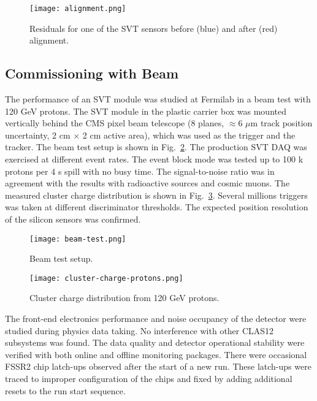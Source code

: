 \begin{figure}[hbt] 
\centering 
\texttt{[image: alignment.png]}
\caption{Residuals for one of the SVT sensors before (blue) and after (red) alignment.}
\label{fig:alignment}
\end{figure}

\subsection{Commissioning with Beam}

The performance of an SVT module was studied at Fermilab in a beam test with 120 GeV protons. The SVT module in the plastic carrier box was mounted vertically behind the CMS pixel beam telescope (8 planes, $\approx$6 $\mu$m track position uncertainty, 2 cm $\times$ 2 cm active area), which was used as the trigger and the tracker. The beam test setup is shown in Fig.~\ref{fig:beam-test}. The production SVT DAQ was exercised at different event rates. The event block mode was tested up to 100 k protons per 4 s spill with no busy time. The signal-to-noise ratio was in agreement with the results with radioactive sources and cosmic muons. The measured cluster charge distribution is shown in Fig.~\ref{fig:cluster-charge-protons}. Several millions triggers was taken at different discriminator thresholds.  The expected position resolution of the silicon sensors was confirmed. 

\begin{figure}[hbt] 
\centering 
\texttt{[image: beam-test.png]}
\caption{Beam test setup.}
\label{fig:beam-test}
\end{figure}

\begin{figure}[h] 
\centering 
\texttt{[image: cluster-charge-protons.png]}
\caption{Cluster charge distribution from 120 GeV protons.}
\label{fig:cluster-charge-protons}
\end{figure}

The front-end electronics performance and noise occupancy of the detector were studied during physics data taking. No interference with other CLAS12 subsystems was found. The data quality and detector operational stability  were verified with both online and offline monitoring packages. There were occasional FSSR2 chip latch-ups observed after the start of a new run. These latch-ups were traced to improper configuration of the chips and fixed by adding additional resets to the run start sequence.

